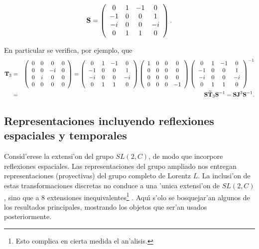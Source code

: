 \begin{equation}
{\bf S}=\left( 
\begin{array}{cccc}
0 & 1 & -1 & 0 \\ 
-1 & 0 & 0 & 1 \\ 
-i & 0 & 0 & -i \\ 
0 & 1 & 1 & 0
\end{array}
\right) . 
\end{equation}

En particular se verifica, por ejemplo, que 
\begin{eqnarray*}
{\bf T}_{3} &=&\allowbreak \left( 
\begin{array}{cccc}
0 & 0 & 0 & 0 \\ 
0 & 0 & -i & 0 \\ 
0 & i & 0 & 0 \\ 
0 & 0 & 0 & 0
\end{array}
\right) =\left( 
\begin{array}{cccc}
0 & 1 & -1 & 0 \\ 
-1 & 0 & 0 & 1 \\ 
-i & 0 & 0 & -i \\ 
0 & 1 & 1 & 0
\end{array}
\right) \left( 
\begin{array}{cccc}
1 & 0 & 0 & 0 \\ 
0 & 0 & 0 & 0 \\ 
0 & 0 & 0 & 0 \\ 
0 & 0 & 0 & -1
\end{array}
\right) \left( 
\begin{array}{cccc}
0 & 1 & -1 & 0 \\
-1 & 0 & 0 & 1 \\ 
-i & 0 & 0 & -i \\ 
0 & 1 & 1 & 0
\end{array}
\right) ^{-1} \\
&=&{\bf S}\widetilde{{\bf T}}_{3}{\bf S}^{-1}={\bf SJ}^3{\bf S}^{-1}.
\end{eqnarray*}

\subsection{Representaciones incluyendo reflexiones espaciales y temporales%
\label{riret}}

Consid'erese la extensi'on del grupo $SL(2,C)$, de modo que incorpore
reflexiones espaciales. Las representaciones del grupo ampliado nos entregan
representaciones (proyectivas) del grupo completo de Lorentz $L$. La
inclusi'on de estas transformaciones discretas no conduce a una 'unica
extensi'on de $SL(2,C)$, sino que a 8 extensiones inequivalentes\footnote{%
Esto complica en cierta medida el an'alisis.} \cite{Cornwell}. Aqu{\'\i}
s'olo se bosquejar'an algunos de los resultados principales, mostrando
los objetos que ser'an usados posteriormente.

